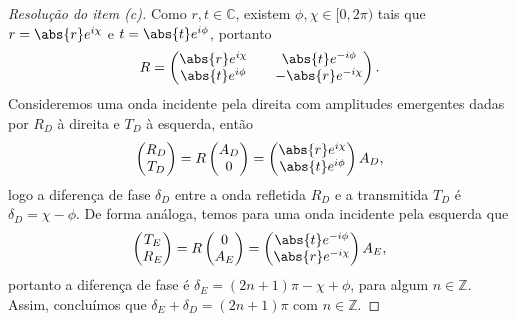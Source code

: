 \begin{proof}[Resolução do item (c)]
    Como \(r, t \in \mathbb{C}\), existem \(\phi, \chi \in [0, 2\pi)\) tais que \(r = \abs{r}e^{i\chi}\) e \(t = \abs{t}e^{i\phi}\), portanto
    \begin{equation*}
        R = \begin{pmatrix}
            \abs{r}e^{i\chi} && \abs{t}e^{-i\phi}\\
            \abs{t}e^{i\phi} && -\abs{r}e^{-i\chi}
        \end{pmatrix}.
    \end{equation*}
    Consideremos uma onda incidente pela direita com amplitudes emergentes dadas por \(R_D\) à direita e \(T_D\) à esquerda, então
    \begin{equation*}
        \begin{pmatrix}
            R_D\\
            T_D
        \end{pmatrix} =
        R \begin{pmatrix}
            A_D\\0
        \end{pmatrix} =
        \begin{pmatrix}
            \abs{r}e^{i\chi}\\\abs{t} e^{i\phi}
        \end{pmatrix}A_D,
    \end{equation*}
    logo a diferença de fase \(\delta_D\) entre a onda refletida \(R_D\) e a transmitida \(T_D\) é \(\delta_D = \chi - \phi\). De forma análoga, temos para uma onda incidente pela esquerda que
    \begin{equation*}
        \begin{pmatrix}
            T_E\\
            R_E
        \end{pmatrix} =
        R \begin{pmatrix}
            0\\A_E
        \end{pmatrix} =
        \begin{pmatrix}
            \abs{t}e^{-i\phi}\\\abs{r} e^{-i\chi}
        \end{pmatrix}A_E,
    \end{equation*}
    portanto a diferença de fase é \(\delta_E = (2n+1)\pi - \chi + \phi\), para algum \(n \in \mathbb{Z}\). Assim, concluímos que \(\delta_E + \delta_D = (2n + 1)\pi\) com \(n \in \mathbb{Z}\).


\end{proof}
